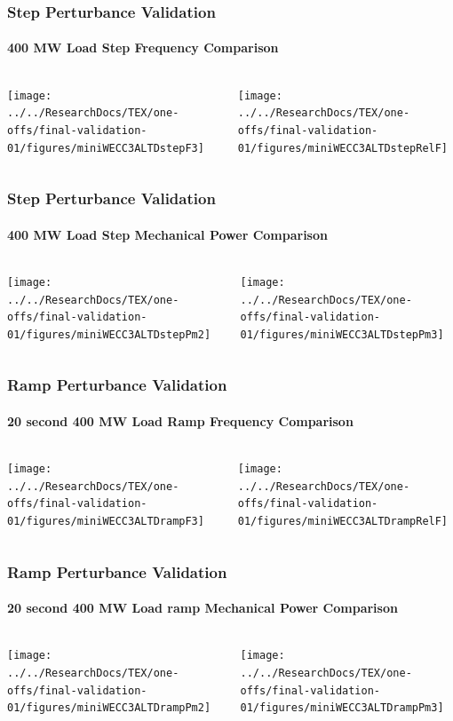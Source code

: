\documentclass[14pt, unknownkeysallowed]{beamer}
\begin{document}
\begin{frame}
\frametitle{Step Perturbance Validation}
\framesubtitle{400 MW Load Step Frequency Comparison}
\begin{columns}
	\begin{column}{.5\linewidth}
		\texttt{[image: ../../ResearchDocs/TEX/one-offs/final-validation-01/figures/miniWECC3ALTDstepF3]}
	\end{column}
	\begin{column}{.5\linewidth}
		\texttt{[image: ../../ResearchDocs/TEX/one-offs/final-validation-01/figures/miniWECC3ALTDstepRelF]}
	\end{column}
\end{columns}
\end{frame}
\begin{frame}
\frametitle{Step Perturbance Validation}
\framesubtitle{400 MW Load Step Mechanical Power Comparison}
\begin{columns}
	\begin{column}{.5\linewidth}
		\texttt{[image: ../../ResearchDocs/TEX/one-offs/final-validation-01/figures/miniWECC3ALTDstepPm2]}
	\end{column}
	\begin{column}{.5\linewidth}
		\texttt{[image: ../../ResearchDocs/TEX/one-offs/final-validation-01/figures/miniWECC3ALTDstepPm3]}
	\end{column}
\end{columns}
\end{frame}
\begin{frame}
\frametitle{Ramp Perturbance Validation}
\framesubtitle{20 second 400 MW Load Ramp Frequency Comparison}
\begin{columns}
	\begin{column}{.5\linewidth}
		\texttt{[image: ../../ResearchDocs/TEX/one-offs/final-validation-01/figures/miniWECC3ALTDrampF3]}
	\end{column}
	\begin{column}{.5\linewidth}
		\texttt{[image: ../../ResearchDocs/TEX/one-offs/final-validation-01/figures/miniWECC3ALTDrampRelF]}
	\end{column}
\end{columns}
\end{frame}
\begin{frame}
\frametitle{Ramp Perturbance Validation}
\framesubtitle{20 second 400 MW Load ramp Mechanical Power Comparison}
\begin{columns}
\begin{column}{.5\linewidth}
	\texttt{[image: ../../ResearchDocs/TEX/one-offs/final-validation-01/figures/miniWECC3ALTDrampPm2]}
\end{column}
\begin{column}{.5\linewidth}
	\texttt{[image: ../../ResearchDocs/TEX/one-offs/final-validation-01/figures/miniWECC3ALTDrampPm3]}
\end{column}
\end{columns}
\end{frame}
\end{document}
